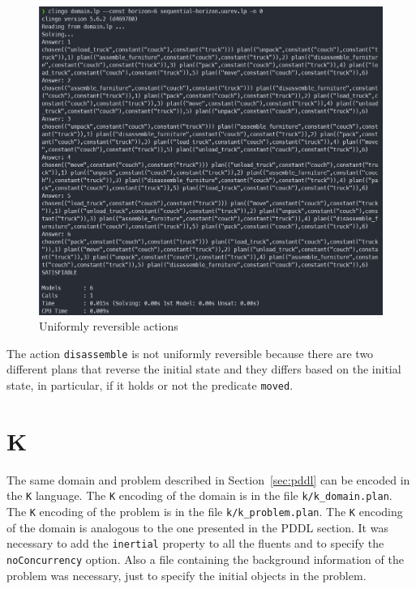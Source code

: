 \documentclass[12pt]{article}
\begin{document}
    \begin{figure}[ht]
        \centering
        \includegraphics[width=\textwidth]{../img/unif_rev_actions}
        \caption{Uniformly reversible actions}
        \label{fig:pddl-reversible}
    \end{figure}
    The action \texttt{disassemble} is not uniformly reversible because there are two different plans that reverse the initial state and they differs based on the initial state, in particular, if it holds or not the predicate \texttt{moved}.

    \section{K}\label{sec:k}
    The same domain and problem described in Section~\ref{sec:pddl} can be encoded in the \texttt{K} language.
    The \texttt{K} encoding of the domain is in the file \texttt{k/k\_domain.plan}.
    The \texttt{K} encoding of the problem is in the file \texttt{k/k\_problem.plan}.
    The \texttt{K} encoding of the domain is analogous to the one presented in the PDDL section.
    It was necessary to add the \texttt{inertial} property to all the fluents and to specify the \texttt{noConcurrency} option.
    Also a file containing the background information of the problem was necessary, just to specify the initial objects in the problem.
\end{document}
